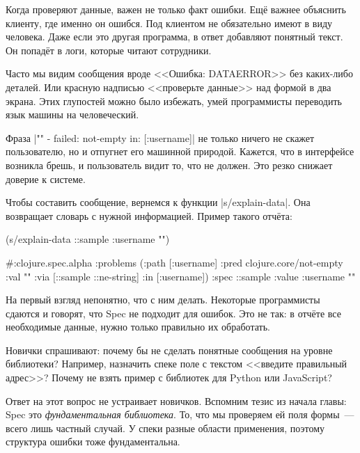 
\label{spec-messages}

Когда проверяют данные, важен не только факт ошибки. Ещ\"{е} важнее объяснить
клиенту, где именно он ошибся. Под клиентом не обязательно имеют в виду
человека. Даже если это другая программа, в ответ добавляют понятный текст. Он
попад\"{е}т в логи, которые читают сотрудники.

Часто мы видим сообщения вроде <<Ошибка: DATAERROR>> без каких-либо деталей. Или
красную надписью <<проверьте данные>> над формой в два экрана. Этих глупостей
можно было избежать, умей программисты переводить язык машины на человеческий.


Фраза \spverb|"" - failed: not-empty in: [:username]| не только ничего не скажет
пользователю, но и отпугнет его машинной природой. Кажется, что в интерфейсе
возникла брешь, и пользователь видит то, что не должен. Это резко снижает
доверие к системе.

Чтобы составить сообщение, вернемся к функции \spverb|s/explain-data|.  Она
возвращает словарь с нужной информацией. Пример такого отч\"{е}та:

\begin{english}
  \begin{clojure}
(s/explain-data ::sample {:username ""})

#:clojure.spec.alpha
{:problems
 ({:path [:username]
   :pred clojure.core/not-empty
   :val ""
   :via [::sample ::ne-string]
   :in [:username]})
 :spec ::sample
 :value {:username ""}}
  \end{clojure}
\end{english}


На первый взгляд непонятно, что с ним делать. Некоторые программисты сдаются и
говорят, что Spec не подходит для ошибок. Это не так: в отч\"{е}те все
необходимые данные, нужно только правильно их обработать.

Новички спрашивают: почему бы не сделать понятные сообщения на уровне
библиотеки? Например, назначить спеке поле с текстом <<введите правильный
адрес>>? Почему не взять пример с библиотек для Python или JavaScript?


Ответ на этот вопрос не устраивает новичков. Вспомним тезис из начала главы:
Spec это \emph{фундаментальная библиотека}. То, что мы проверяем ей поля
формы~--- всего лишь частный случай. У спеки разные области применения, поэтому
структура ошибки тоже фундаментальна.


